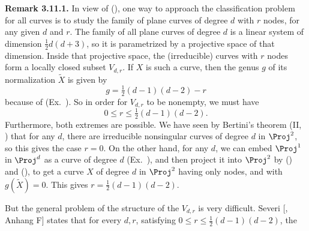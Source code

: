 {\medskip
\noindent\hypertarget{result-IV-3.11.1}{}\textbf{Remark 3.11.1.} In view of (), one way to approach the classification problem for all curves is to study the family of plane curves of degree $d$ with $r$ nodes, for any given $d$ and $r$. The family of all plane curves of degree $d$ is a linear system of dimension $\frac12d(d+3)$, so it is parametrized by a projective space of that dimension. Inside that projective space, the (irreducible) curves with $r$ nodes form a locally closed subset $V_{d,r}$. If $X$ is such a curve, then the genus $g$ of its normalization $\widetilde X$ is given by
\[
g=\tfrac12(d-1)(d-2)-r
\]
\noindent because of (Ex.~). So in order for $V_{d,r}$ to be nonempty, we must have
\[
0\le r\le\tfrac12(d-1)(d-2).
\]
\noindent Furthermore, both extremes are possible. We have seen by Bertini's theorem (II, ) that for any $d$, there are irreducible nonsingular curves of degree $d$ in $\Proj^2$, so this gives the case $r=0$. On the other hand, for any $d$, we can embed $\Proj^1$ in $\Proj^d$ as a curve of degree $d$ (Ex.~), and then project it into $\Proj^2$ by () and (), to get a curve $X$ of degree $d$ in $\Proj^2$ having only nodes, and with $g(\widetilde X)=0$. This gives $r=\frac12(d-1)(d-2)$.

But the general problem of the structure of the $V_{d,r}$ is very difficult. Severi [, Anhang F] states that for every $d,r$, satisfying $0\le r\le\frac12(d-1)(d-2)$, the
}
